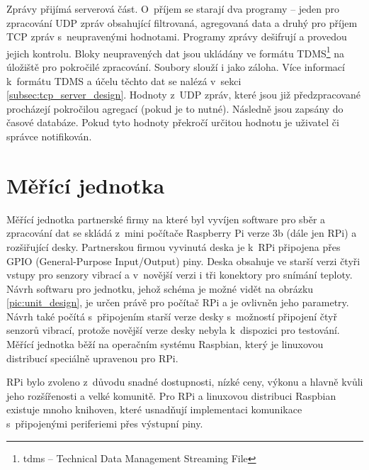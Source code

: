 Zprávy přijímá serverová část. O~příjem se starají dva programy -- jeden pro zpracování UDP zpráv obsahující filtrovaná, agregovaná data a druhý pro příjem TCP zpráv s~neupravenými hodnotami. Programy zprávy dešifrují a provedou jejich kontrolu. Bloky neupravených dat jsou ukládány ve formátu TDMS\footnote{tdms -- Technical Data Management Streaming File} na úložiště pro pokročilé zpracování. Soubory slouží i jako záloha. Více informací k~formátu TDMS a účelu těchto dat se nalézá v~sekci \ref{subsec:tcp_server_design}. Hodnoty z~UDP zpráv, které jsou již předzpracované procházejí pokročilou agregací (pokud je to nutné). Následně jsou zapsány do časové databáze. Pokud tyto hodnoty překročí určitou hodnotu je uživatel či správce notifikován.


\section{Měřící jednotka}
Měřící jednotka partnerské firmy na které byl vyvíjen software pro sběr a zpracování dat se skládá z~mini počítače Raspberry Pi verze 3b (dále jen RPi) a rozšiřující desky. Partnerskou firmou vyvinutá deska je k~RPi připojena přes GPIO (General-Purpose Input/Output) piny. Deska obsahuje ve starší verzi čtyři vstupy pro senzory vibrací a v~novější verzi i tři konektory pro snímání teploty. Návrh softwaru pro jednotku, jehož schéma je možné vidět na obrázku \ref{pic:unit_design}, je určen právě pro počítač RPi a je ovlivněn jeho parametry. Návrh také počítá s~připojením starší verze desky s~možností připojení čtyř senzorů vibrací, protože novější verze desky nebyla k~dispozici pro testování. Měřící jednotka běží na operačním systému Raspbian, který je linuxovou distribucí speciálně upravenou pro RPi.

RPi bylo zvoleno z~důvodu snadné dostupnosti, nízké ceny, výkonu a hlavně kvůli jeho rozšířenosti a velké komunitě. Pro RPi a linuxovou distribuci Raspbian existuje mnoho knihoven, které usnadňují implementaci komunikace s~připojenými periferiemi přes výstupní piny. 


